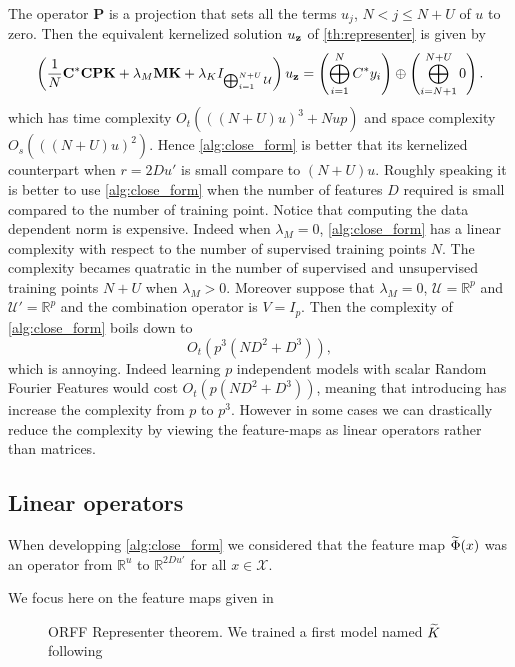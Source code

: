 The operator $\mathbf{P}$ is a projection that sets all the terms $u_j$, $N < j \le N + U$ of $u$ to zero. Then the equivalent kernelized solution $u_{\boldsymbol{\mathbf{z}}}$ of \cref{th:representer} is given by \cite{minh2016unifying}
\begin{dmath*}
\left(\frac{1}{N}\mathbf{C}^\adjoint \mathbf{C} \mathbf{P} \mathbf{K} + \lambda_M \mathbf{M} \mathbf{K} + \lambda_K I_{\Vect_{i=1}^{N+U}\mathcal{U}}\right)u_{\seq{z}}=\left(\Vect_{i=1}^N C^\adjoint y_i\right) \oplus \left(\Vect_{i=N+1}^{N+U} 0 \right).
\end{dmath*}
which has time complexity $O_t(((N+U)u)^3+ Nup)$ and space complexity $O_s(((N+U)u)^2)$. Hence \cref{alg:close_form} is better that its kernelized counterpart when $r=2Du'$ is small compare to $(N+U)u$. Roughly speaking it is better to use \cref{alg:close_form} when the number of features $D$ required is small compared to the number of training point. Notice that computing the data dependent norm is expensive. Indeed when $\lambda_M=0$, \cref{alg:close_form} has a linear complexity with respect to the number of supervised training points $N$. The complexity becames quatratic in the number of supervised and unsupervised training points $N+U$ when $\lambda_M>0$. Moreover suppose that $\lambda_M=0$, $\mathcal{U}=\mathbb{R}^p$ and $\mathcal{U}'=\mathbb{R}^{p}$ and the combination operator is $V=I_{p}$. Then the complexity of \cref{alg:close_form} boils down to
\begin{dmath*}
O_t(p^3(ND^2+D^3)),
\end{dmath*}
which is annoying. Indeed learning $p$ independent models with scalar Random Fourier Features would cost $O_t(p(ND^2+D^3))$, meaning that introducing has increase the complexity from $p$ to $p^3$. However in some cases we can drastically reduce the complexity by viewing the feature-maps as linear operators rather than matrices.

\subsection{Linear operators}
When developping \cref{alg:close_form} we considered that the feature map $\widetilde{\Phi}(x)$ was an operator from $\mathbb{R}^u$ to $\mathbb{R}^{2Du'}$ for all $x\in\mathcal{X}$.

We focus here on the feature maps given in

\begin{landscape}
\begin{figure}[htb]
\centering
\resizebox{\textheight}{!}{%

}
\caption[ORFF Representer theorem]{ORFF Representer theorem. We trained a first model named $\widetilde{K}$ following}
\label{fig:representer}
\end{figure}
\end{landscape}


